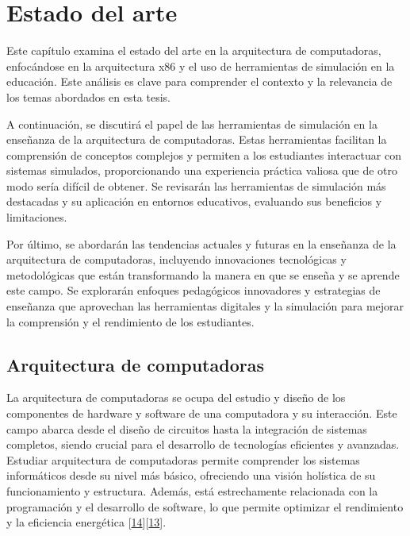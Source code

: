 \documentclass[12pt,twoside]{templates/unerthesis}
\begin{document}
\hypertarget{estado-del-arte}{%
\chapter{Estado del arte}\label{estado-del-arte}}

Este capítulo examina el estado del arte en la arquitectura de computadoras, enfocándose en la arquitectura x86 y el uso de herramientas de simulación en la educación. Este análisis es clave para comprender el contexto y la relevancia de los temas abordados en esta tesis.

A continuación, se discutirá el papel de las herramientas de simulación en la enseñanza de la arquitectura de computadoras. Estas herramientas facilitan la comprensión de conceptos complejos y permiten a los estudiantes interactuar con sistemas simulados, proporcionando una experiencia práctica valiosa que de otro modo sería difícil de obtener. Se revisarán las herramientas de simulación más destacadas y su aplicación en entornos educativos, evaluando sus beneficios y limitaciones.

Por último, se abordarán las tendencias actuales y futuras en la enseñanza de la arquitectura de computadoras, incluyendo innovaciones tecnológicas y metodológicas que están transformando la manera en que se enseña y se aprende este campo. Se explorarán enfoques pedagógicos innovadores y estrategias de enseñanza que aprovechan las herramientas digitales y la simulación para mejorar la comprensión y el rendimiento de los estudiantes.

\hypertarget{arquitectura-de-computadoras}{%
\section{Arquitectura de computadoras}\label{arquitectura-de-computadoras}}

La arquitectura de computadoras se ocupa del estudio y diseño de los componentes de hardware y software de una computadora y su interacción. Este campo abarca desde el diseño de circuitos hasta la integración de sistemas completos, siendo crucial para el desarrollo de tecnologías eficientes y avanzadas. Estudiar arquitectura de computadoras permite comprender los sistemas informáticos desde su nivel más básico, ofreciendo una visión holística de su funcionamiento y estructura. Además, está estrechamente relacionada con la programación y el desarrollo de software, lo que permite optimizar el rendimiento y la eficiencia energética {[}\protect\hyperlink{ref-stallings_computer_2013}{14}{]}{[}\protect\hyperlink{ref-hennessy_computer_2012}{13}{]}.
\end{document}
